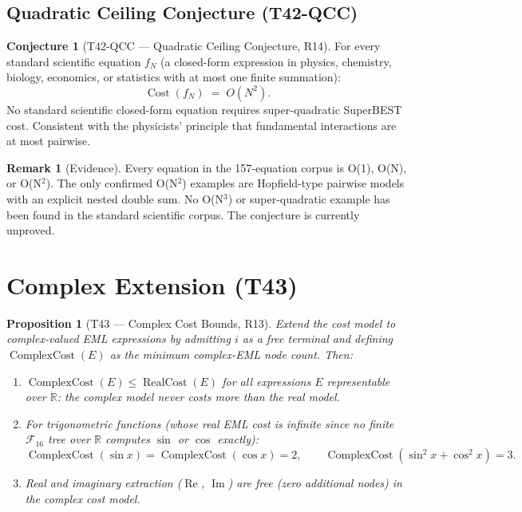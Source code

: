 \documentclass[12pt,a4paper]{article}
\newtheorem{proposition}[theorem]{Proposition}
\theoremstyle{definition}
\newtheorem{conjecture}[theorem]{Conjecture}
\newtheorem{remark}[theorem]{Remark}
\newcommand{\Cost}{\operatorname{Cost}}
\newcommand{\RC}{\operatorname{RealCost}}
\newcommand{\CC}{\operatorname{ComplexCost}}
\begin{document}
\subsection{Quadratic Ceiling Conjecture (T42-QCC)}

\begin{conjecture}[T42-QCC --- Quadratic Ceiling Conjecture, R14]
\label{conj:QCC}
For every standard scientific equation $f_N$ (a closed-form expression in
physics, chemistry, biology, economics, or statistics with at most one finite
summation):
\[
  \Cost(f_N) \;=\; O(N^2).
\]
No standard scientific closed-form equation requires super-quadratic
SuperBEST cost.  Consistent with the physicists' principle that fundamental
interactions are at most pairwise.
\end{conjecture}

\begin{remark}[Evidence]
Every equation in the 157-equation corpus is O(1), O(N), or O(N$^2$).
The only confirmed O(N$^2$) examples are Hopfield-type pairwise models with
an explicit nested double sum.  No O(N$^3$) or super-quadratic example has
been found in the standard scientific corpus.  The conjecture is currently
unproved.
\end{remark}

\section{Complex Extension (T43)}
\label{sec:complex}

\begin{proposition}[T43 --- Complex Cost Bounds, R13]
\label{prop:complexcost}
Extend the cost model to complex-valued EML expressions by admitting $i$
as a free terminal and defining $\CC(E)$ as the minimum complex-EML node
count.  Then:
\begin{enumerate}
  \item $\CC(E) \leq \RC(E)$ for all expressions $E$ representable over
        $\mathbb{R}$: the complex model never costs more than the real model.
  \item For trigonometric functions (whose real EML cost is infinite since no
        finite $\mathcal{F}_{16}$ tree over $\mathbb{R}$ computes $\sin$ or
        $\cos$ exactly):
        \[
          \CC(\sin x) = \CC(\cos x) = 2, \qquad
          \CC(\sin^2 x + \cos^2 x) = 3.
        \]
  \item Real and imaginary extraction ($\operatorname{Re}$,
        $\operatorname{Im}$) are free (zero additional nodes) in the complex
        cost model.
\end{enumerate}
\end{proposition}
\end{document}
